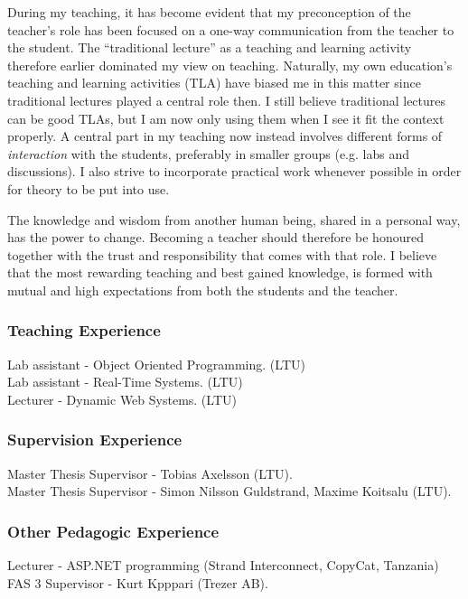 \documentclass{article}
\begin{document}
During my teaching, it has become evident that my preconception of the teacher’s role has been focused on a one-way communication from the teacher to the student. The “traditional lecture” as a teaching and learning activity therefore earlier dominated my view on teaching. Naturally, my own education’s teaching and learning activities (TLA) have biased me in this matter since traditional lectures played a central role then. I still believe traditional lectures can be good TLAs, but I am now only using them when I see it fit the context properly. A central part in my teaching now instead involves different forms of \textit{interaction} with the students, preferably in smaller groups (e.g. labs and discussions). I also strive to incorporate practical work whenever possible in order for theory to be put into use.

The knowledge and wisdom from another human being, shared in a personal way, has the power to change. Becoming a teacher should therefore be honoured together with the trust and responsibility that comes with that role. I believe that the most rewarding teaching and best gained knowledge, is formed with mutual and high expectations from both the students and the teacher.

\subsubsection{Teaching Experience}
Lab assistant - Object Oriented Programming. (LTU) \\
Lab assistant - Real-Time Systems. (LTU) \\
Lecturer - Dynamic Web Systems. (LTU) \\

\subsubsection{Supervision Experience}
Master Thesis Supervisor - Tobias Axelsson (LTU). \\
Master Thesis Supervisor - Simon Nilsson Guldstrand, Maxime Koitsalu (LTU). \\

\subsubsection{Other Pedagogic Experience}
Lecturer - ASP.NET programming (Strand Interconnect, CopyCat, Tanzania)
FAS 3 Supervisor - Kurt Kpppari (Trezer AB).\\
\end{document}
